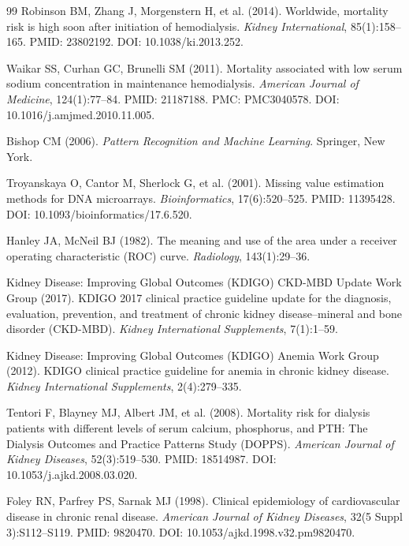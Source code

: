 \documentclass[12pt,a4paper,twoside]{report}
\begin{document}
\begin{thebibliography}{99}
Robinson BM, Zhang J, Morgenstern H, et al. (2014).
\newblock Worldwide, mortality risk is high soon after initiation of hemodialysis.
\newblock \textit{Kidney International}, 85(1):158--165.
\newblock PMID: 23802192. DOI: 10.1038/ki.2013.252.

Waikar SS, Curhan GC, Brunelli SM (2011).
\newblock Mortality associated with low serum sodium concentration in maintenance hemodialysis.
\newblock \textit{American Journal of Medicine}, 124(1):77--84.
\newblock PMID: 21187188. PMC: PMC3040578. DOI: 10.1016/j.amjmed.2010.11.005.

Bishop CM (2006).
\newblock \textit{Pattern Recognition and Machine Learning}.
\newblock Springer, New York.

Troyanskaya O, Cantor M, Sherlock G, et al. (2001).
\newblock Missing value estimation methods for DNA microarrays.
\newblock \textit{Bioinformatics}, 17(6):520--525.
\newblock PMID: 11395428. DOI: 10.1093/bioinformatics/17.6.520.

Hanley JA, McNeil BJ (1982).
\newblock The meaning and use of the area under a receiver operating characteristic (ROC) curve.
\newblock \textit{Radiology}, 143(1):29--36.

Kidney Disease: Improving Global Outcomes (KDIGO) CKD-MBD Update Work Group (2017).
\newblock KDIGO 2017 clinical practice guideline update for the diagnosis, evaluation, prevention, and treatment of chronic kidney disease--mineral and bone disorder (CKD-MBD).
\newblock \textit{Kidney International Supplements}, 7(1):1--59.

Kidney Disease: Improving Global Outcomes (KDIGO) Anemia Work Group (2012).
\newblock KDIGO clinical practice guideline for anemia in chronic kidney disease.
\newblock \textit{Kidney International Supplements}, 2(4):279--335.

Tentori F, Blayney MJ, Albert JM, et al. (2008).
\newblock Mortality risk for dialysis patients with different levels of serum calcium, phosphorus, and PTH: The Dialysis Outcomes and Practice Patterns Study (DOPPS).
\newblock \textit{American Journal of Kidney Diseases}, 52(3):519--530.
\newblock PMID: 18514987. DOI: 10.1053/j.ajkd.2008.03.020.

Foley RN, Parfrey PS, Sarnak MJ (1998).
\newblock Clinical epidemiology of cardiovascular disease in chronic renal disease.
\newblock \textit{American Journal of Kidney Diseases}, 32(5 Suppl 3):S112--S119.
\newblock PMID: 9820470. DOI: 10.1053/ajkd.1998.v32.pm9820470.


\end{thebibliography}
\end{document}
